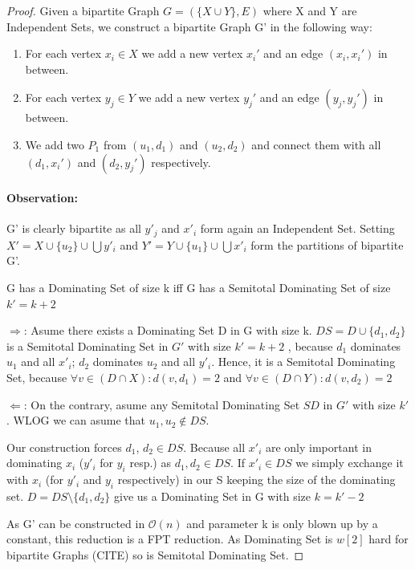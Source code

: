 \begin{proof}
    Given a bipartite Graph $G = ( \{X \cup Y\}, E)$ where X and Y are Independent Sets, we construct a bipartite Graph G' in the following way:
    \begin{enumerate}
        \item For each vertex $x_i \in X$ we add a new vertex $x_i'$  and an edge $(x_i, x_i')$ in between.
        \item For each vertex $y_j \in Y$ we add a new vertex $y_j'$ and an edge $(y_j, y_j')$ in between.
        \item We add two $P_1$ from $(u_1, d_1)$ and $(u_2, d_2)$  and connect them with all $(d_1, x_i')$ and $(d_2, y_j')$ respectively.
    \end{enumerate}
    \paragraph*{Observation:} G' is clearly bipartite as all $y'_j$ and $x'_i$ form again an Independent Set. Setting  $X' = X \cup \{u_2\} \cup \bigcup y'_i$ and $Y' = Y \cup \{u_1\} \cup \bigcup {x'_i}$ form the partitions of bipartite G'.

    \begin{corollary} G has a Dominating Set of size k iff G has a Semitotal Dominating Set of size $k' = k + 2$
    \end{corollary} 
     $\Rightarrow$: Asume there exists a Dominating Set D in G with size k. $DS = D\cup \{d_1,d_2\}$ is a Semitotal Dominating Set in $G'$ with size $k' = k+2 $ , because $d_1$ dominates $u_1$ and all $x'_i$; $d_2$ dominates $u_2$ and all $y'_i$. Hence, it is a Semitotal Dominating Set, because $\forall v \in (D \cap X): d(v, d_1) = 2$ and $\forall v \in (D \cap Y): d(v, d_2) = 2$

    $\Leftarrow$: On the contrary, asume any Semitotal Dominating Set $SD$ in $G'$ with size $k'$. WLOG we can asume that $u_1, u_2 \notin DS$. 
    
    Our construction forces $d_1$, $d_2 \in DS$. Because all $x'_i$ are only important in dominating $x_i$ ($y'_i$ for $y_i$ resp.) as $d_1, d_2 \in DS$. If $x'_i \in DS$ we simply exchange it with $x_i$ (for $y'_i$ and $y_i$ respectively) in our S keeping the size of the dominating set. $D = DS \setminus \{ d_1,d_2\}$ give us a Dominating Set in G with size $ k = k' - 2$

    As G' can be constructed in $\mathcal{O}(n)$ and parameter k is only blown up by a constant, this reduction is a FPT reduction. As Dominating Set is $w[2]$ hard for bipartite Graphs (CITE) so is Semitotal Dominating Set.
\end{proof}


